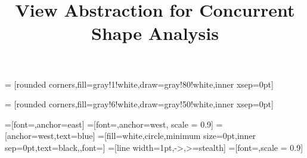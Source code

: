 \title{View Abstraction for Concurrent Shape Analysis}
\author{}



\usepackage{array}
\usepackage{dsfont,stmaryrd,listings,todonotes,color,pifont,stmaryrd,wrapfig,listings,verbatim,fancyvrb,textcomp,bbm}
\usepackage[ruled,noend,nofillcomment,linesnumbered]{algorithm2e}


\usepackage{pgf}
\usepackage{tikz}
\usepackage{mdframed}
\usepackage{caption}
\usepackage{paralist}
\usepackage{todonotes}
\usepackage{url}
\usepackage{wrapfig}
\usepackage{multirow}
\usepackage{times}
\usepackage{listings}
\lstset{language=C,numberstyle=\footnotesize,
basicstyle=\ttfamily\footnotesize
}


\usetikzlibrary{automata,positioning}
\usetikzlibrary{trees}
\usetikzlibrary{shapes}
\usetikzlibrary{petri}
\usetikzlibrary{arrows}
\usetikzlibrary{backgrounds}
\usetikzlibrary{calc}
\usetikzlibrary{fit}
\usetikzlibrary{decorations.pathmorphing}
\usetikzlibrary{decorations.text}
\usetikzlibrary{shapes.callouts}





=
[rounded corners,fill=gray!1!white,draw=gray!80!white,inner xsep=0pt]%


=
[rounded corners,fill=gray!6!white,draw=gray!50!white,inner xsep=0pt]%

  
=[font={\footnotesize\tt},anchor=east]
=[font={\footnotesize\tt},anchor=west, scale = 0.9]
=[anchor=west,text=blue]
=[fill=white,circle,minimum size=0pt,inner sep=0pt,text=black,,font=\tiny]
=[line width=1pt,->,>=stealth]
=[font=\small,scale = 0.9]









